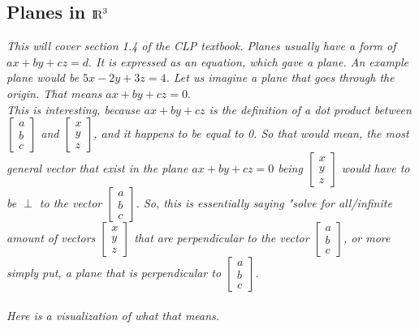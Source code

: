 \documentclass[addpoints]{exam}
\begin{document}
\subsection{
Planes in ${\rm I\!R}^3$
}
\textit{
This will cover section 1.4 of the CLP textbook. Planes usually have a form of $ax+by+cz=d.$ It is expressed as an equation, which gave a plane. An example plane would be $5x-2y+3z=4$. Let us imagine a plane that goes through the origin. That means $ax+by+cz=0.$ }\\
\textit{This is interesting, because $ax+by+cz$ is the definition of a dot product between $\begin{bmatrix}
    a\\b\\c
\end{bmatrix}$ and $\begin{bmatrix}
    x\\y\\z
\end{bmatrix}$, and it happens to be equal to 0. So that would mean, the most general vector that exist in the plane $ax+by+cz=0$ being $\begin{bmatrix}
    x\\y\\z
\end{bmatrix}$ would have to be $\perp$ to the vector $\begin{bmatrix}
    a\\b\\c
\end{bmatrix}$. So, this is essentially saying "solve for all/infinite amount of vectors $\begin{bmatrix}
    x\\y\\z
\end{bmatrix}$ that are perpendicular to the vector $\begin{bmatrix}
    a\\b\\c
\end{bmatrix}$, or more simply put, a plane that is perpendicular to $\begin{bmatrix}
    a\\b\\c
\end{bmatrix}$.}\\\\
\textit{Here is a visualization of what that means.}
\end{document}
